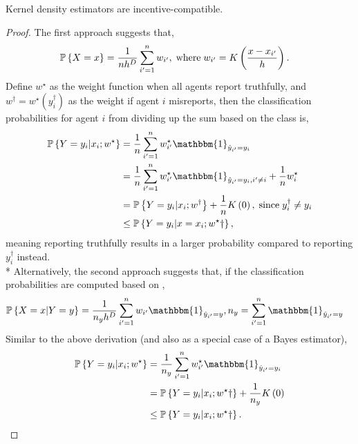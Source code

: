 \documentclass{article}
\begin{document}
\begin{cor} \label{cor:kde} 
Kernel density estimators are incentive-compatible.
\end{cor}
\begin{proof} \label{proof:kdepf} 
The first approach suggests that,
\begin{align*}
\mathbb{P}\left\{X = x\right\} &= \dfrac{1}{n h^{D}} \displaystyle\sum_{i'=1}^{n} w_{i'}, \text{\;where\;} w_{i'} = K\left(\dfrac{x - x_{i'}}{h}\right).
\end{align*}
Define $w^\star $ as the weight function when all agents report truthfully, and $w^{\dagger} = w^\star \left(y^{\dagger}_{i}\right)$ as the weight if agent $i $ misreports, then the classification probabilities for agent $i $ from dividing up the sum based on the class is,
\begin{align*}
\mathbb{P}\left\{Y = y_{i} | x_{i} ; w^\star \right\} &= \dfrac{1}{n} \displaystyle\sum_{i'=1}^{n} w^\star _{i'} \mathbbm{1}_{\hat{y}_{i'} = y_{i}}
\\ &= \dfrac{1}{n} \displaystyle\sum_{i'=1}^{n} w^\star _{i'} \mathbbm{1}_{\hat{y}_{i'} = y_{i}, i' \neq  i} + \dfrac{1}{n} w^\star _{i}
\\ &= \mathbb{P}\left\{Y = y_{i} | x_{i} ; w^{\dagger}\right\} + \dfrac{1}{n} K\left(0\right), \text{\;since\;} y^{\dagger}_{i} \neq  y_{i}
\\ &\leq  \mathbb{P}\left\{Y = y_{i} | x = x_{i} ; w^\star \dagger\right\},
\end{align*}
meaning reporting truthfully results in a larger probability compared to reporting $y^{\dagger}_{i}$ instead.
\\* Alternatively, the second approach suggests that, if the classification probabilities are computed based on \citet*{taylor1997classification},
\begin{align*}
\mathbb{P}\left\{X = x | Y = y\right\} &= \dfrac{1}{n_{y} h^{D}} \displaystyle\sum_{i'=1}^{n} w_{i'} \mathbbm{1}_{\hat{y}_{i'} = y}, n_{y} = \displaystyle\sum_{i'=1}^{n} \mathbbm{1}_{\hat{y}_{i'} = y}
\end{align*}
Similar to the above derivation (and also as a special case of a Bayes estimator),
\begin{align*}
\mathbb{P}\left\{Y = y_{i} | x_{i} ; w^\star \right\} &= \dfrac{1}{n_{y}} \displaystyle\sum_{i'=1}^{n} w^\star _{i'} \mathbbm{1}_{\hat{y}_{i'} = y_{i}}
\\ &= \mathbb{P}\left\{Y = y_{i} | x_{i} ; w^\star \dagger\right\} + \dfrac{1}{n_{y}} K\left(0\right)
\\ &\leq  \mathbb{P}\left\{Y = y_{i} | x_{i} ; w^\star \dagger\right\}.
\end{align*}\end{proof}
\end{document}
